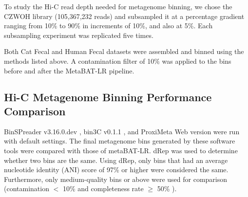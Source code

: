 \documentclass[fleqn,10pt,lineno]{wlpeerj}
\providecommand{\DIFaddtex}[1]{{\protect\color{blue}\uwave{#1}}} %
\providecommand{\DIFaddbegin}{} %
\providecommand{\DIFaddend}{} %
\providecommand{\DIFdelbegin}{} %
\providecommand{\DIFdelend}{} %
\providecommand{\DIFadd}[1]{\texorpdfstring{\DIFaddtex{#1}}{#1}} %
\newcommand{\DIFscaledelfig}{0.5}
\newlength{\DIFdelgraphicswidth} %
\newlength{\DIFdelgraphicsheight} %
\newcommand{\DIFaddincludegraphics}[2][]{{\color{blue}\fbox{\DIFOincludegraphics[#1]{#2}}}} %
\newcommand{\DIFdelincludegraphics}[2][]{%
\sbox{\DIFdelgraphicsbox}{\DIFOincludegraphics[#1]{#2}}%
\settoboxwidth{\DIFdelgraphicswidth}{\DIFdelgraphicsbox} %
\settoboxtotalheight{\DIFdelgraphicsheight}{\DIFdelgraphicsbox} %
\scalebox{\DIFscaledelfig}{%
\parbox[b]{\DIFdelgraphicswidth}{\usebox{\DIFdelgraphicsbox}\\[-\baselineskip] \rule{\DIFdelgraphicswidth}{0em}}\llap{\resizebox{\DIFdelgraphicswidth}{\DIFdelgraphicsheight}{%
\setlength{\unitlength}{\DIFdelgraphicswidth}%
\begin{picture}(1,1)%
\thicklines\linethickness{2pt} %
{\color[rgb]{1,0,0}\put(0,0){\framebox(1,1){}}}%
{\color[rgb]{1,0,0}\put(0,0){\line( 1,1){1}}}%
{\color[rgb]{1,0,0}\put(0,1){\line(1,-1){1}}}%
\end{picture}%
}\hspace*{3pt}}} %
} %
\DeclareRobustCommand{\DIFaddbegin}{\DIFOaddbegin \let\includegraphics\DIFaddincludegraphics} %
\DeclareRobustCommand{\DIFaddend}{\DIFOaddend \let\includegraphics\DIFOincludegraphics} %
\DeclareRobustCommand{\DIFdelbegin}{\DIFOdelbegin \let\includegraphics\DIFdelincludegraphics} %
\DeclareRobustCommand{\DIFdelend}{\DIFOaddend \let\includegraphics\DIFOincludegraphics} %
\begin{document}
To study the Hi-C read depth needed for metagenome binning, we chose the CZWOH library (105,367,232 reads) and subsampled it at a percentage gradient ranging from 10\% to 90\% in increments of 10\%, and also at 5\%. Each subsampling experiment was replicated five times.      

Both Cat Fecal and Human Fecal datasets were assembled and binned using the methods listed above. A contamination filter of 10\% was applied to the bins before and after the MetaBAT-LR pipeline. 

\subsection*{Hi-C Metagenome Binning Performance Comparison}

BinSPreader v3.16.0.dev \citep{tolstoganov2022binspreader}, bin3C v0.1.1 \citep{demaere2019bin3c}, \DIFaddbegin \DIFadd{hicSPAdes \mbox{%
\citep{ivanova2022hi}}\hskip0pt%
, }\DIFaddend and ProxiMeta Web version \citep{press2017hi} were run with default settings. The final metagenome bins generated by these software tools were compared with those of metaBAT-LR.\DIFdelbegin %
\DIFdelend \DIFaddbegin {} \DIFaddend dRep was used to determine whether two bins are the same. Using dRep, only bins that had an average nucleotide identity (ANI) score of 97\% or higher were considered the same. Furthermore, only medium-quality bins or above were used for comparison (contamination $<$ 10\% and completeness rate $\ge$ 50\% \citep{bowers2017minimum}). \DIFaddbegin {}    
\DIFaddend 
\end{document}
